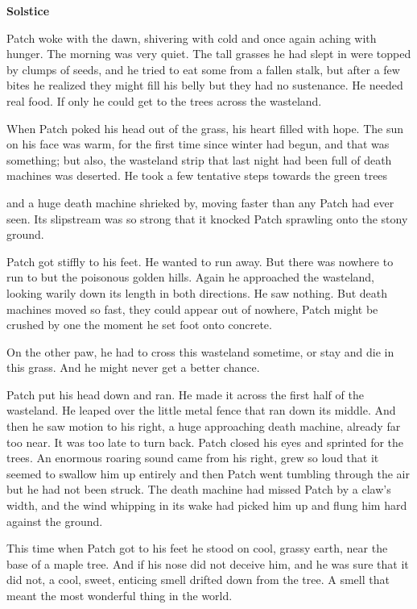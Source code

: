 \documentclass[11pt]{article}
\begin{document}
{\bf Solstice\par
}\par
 Patch woke with the dawn, shivering with cold and once again aching with hunger. The morning was very quiet. The tall grasses he had slept in were topped by clumps of seeds, and he tried to eat some from a fallen stalk, but after a few bites he realized they might fill his belly but they had no sustenance. He needed real food. If only he could get to the trees across the wasteland.\par
 When Patch poked his head out of the grass, his heart filled with hope. The sun on his face was warm, for the first time since winter had begun, and that was something; but also, the wasteland strip that last night had been full of death machines was deserted. He took a few tentative steps towards the green trees %
\par
 and a huge death machine shrieked by, moving faster than any Patch had ever seen. Its slipstream was so strong that it knocked Patch sprawling onto the stony ground.\par
 Patch got stiffly to his feet. He wanted to run away. But there was nowhere to run to but the poisonous golden hills. Again he approached the wasteland, looking warily down its length in both directions. He saw nothing. But death machines moved so fast, they could appear out of nowhere, Patch might be crushed by one the moment he set foot onto concrete.\par
On the other paw, he had to cross this wasteland sometime, or stay and die in this grass. And he might never get a better chance.\par
Patch put his head down and ran. He made it across the first half of the wasteland. He leaped over the little metal fence that ran down its middle. And then he saw motion to his right, a huge approaching death machine, already far too near. It was too late to turn back. Patch closed his eyes and sprinted for the trees. An enormous roaring sound came from his right, grew so loud that it seemed to swallow him up entirely %
 and then Patch went tumbling through the air %
 but he had not been struck. The death machine had missed Patch by a claw's width, and the wind whipping in its wake had picked him up and flung him hard against the ground.\par
This time when Patch got to his feet he stood on cool, grassy earth, near the base of a maple tree. And if his nose did not deceive him, and he was sure that it did not, a cool, sweet, enticing smell drifted down from the tree. A smell that meant the most wonderful thing in the world.\par
\end{document}
